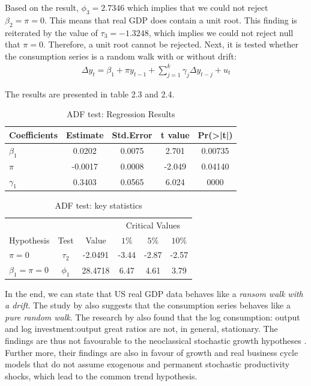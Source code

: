 \documentclass[12pt]{article}
\theoremstyle{definition}
\numberwithin{equation}{section}
\numberwithin{figure}{section}
\numberwithin{table}{section}
\begin{document}
Based on the result, $\phi_3 = 2.7346$ which implies that we could not reject $\beta_2 = \pi = 0$. This means that real GDP does contain a unit root. This finding is reiterated by the value of $\tau_3 = -1.3248$, which implies we could not reject null that $\pi = 0$. Therefore, a unit root cannot be rejected. Next, it is tested whether the consumption series is a random walk with or without drift:
\begin{align*}
  \Delta y_t = \beta_1 + \pi y_{t-1} + \sum_{j=1}^k \gamma_j \Delta y_{t-j} + u_t
\end{align*}

The results are presented in table 2.3 and 2.4.
\begin{table}[H]
  \centering
  \renewcommand{\arraystretch}{1.2}
  \caption{ADF test: Regression Results}
  \begin{tabular}{lcccc}
    \hline
    \hline
    Coefficients & Estimate & Std.Error & t value & Pr(>|t|) \\
    \hline
    $\beta_1$ & 0.0202& 0.0075 &  2.701 & 0.00735  \\
    $\pi$ & -0.0017 & 0.0008 &  -2.049 &  0.04140  \\
    $\gamma_1$ & 0.3403&  0.0565 &  6.024 & 0000 \\
    \hline
    \end{tabular}
\end{table}

\begin{table}[H]
  \renewcommand{\arraystretch}{1.2}
  \centering
  \caption{ADF test: key statistics}
  \begin{tabular}{lccccc}
    \hline
    \hline
    & & &  \multicolumn{3}{c}{Critical Values} \\
    \cline{4-6}
    Hypothesis & Test &  Value & $1\%$ & $5\%$ & $10\%$ \\
    $\pi = 0$ & $\tau_2$ & -2.0491 & -3.44 & -2.87 &  -2.57 \\
    $\beta_1 = \pi = 0$ & $\phi_1$ & 28.4718 &  6.47  & 4.61 &  3.79  \\
    \hline
  \end{tabular}
\end{table}

In the end, we can state that US real GDP data behaves like a \textit{ransom walk with a drift}. The study by \cite{holden1994unit} also suggests that the consumption series behaves like a \textit{pure random walk}. The research by \cite{harvey2003great} also found that the log consumption: output and log investment:output great ratios are not, in general, stationary. The findings are thus not favourable to the neoclassical stochastic growth hypotheses \citep{harvey2003great}. Further more,  their findings are also in favour of growth and real business cycle models that do not assume exogenous and permanent stochastic productivity shocks, which lead to the common trend hypothesis.
\end{document}

